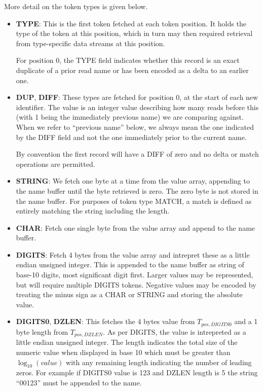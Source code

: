 \documentclass[a4paper]{article}
\begin{document}
More detail on the token types is given below.

\begin{itemize}
\item{\textbf{TYPE}:}
This is the first token fetched at each token position.  It holds the
type of the token at this position, which in turn may then required
retrieval from type-specific data streams at this position.

For position 0, the TYPE field indicates whether this record is an
exact duplicate of a prior read name or has been encoded as a delta to
an earlier one.

\item{\textbf{DUP}, \textbf{DIFF}:}
These types are fetched for position 0, at the start of each new
identifier.  The value is an integer value describing how many reads
before this (with 1 being the immediately previous name) we are
comparing against.  When we refer to ``previous name'' below, we
always mean the one indicated by the DIFF field and not the one
immediately prior to the current name.

By convention the first record will have a DIFF of zero and no delta
or match operations are permitted.

\item{\textbf{STRING}:}
We fetch one byte at a time from the value array, appending to the
name buffer until the byte retrieved is zero.  The zero byte is not
stored in the name buffer.
For purposes of token type MATCH, a match is defined as entirely
matching the string including the length.

\item{\textbf{CHAR}:}
Fetch one single byte from the value array and append to the name buffer.

\item{\textbf{DIGITS}:}
Fetch 4 bytes from the value array and intrepret these as a little
endian unsigned integer.  This is appended to the name buffer as
string of base-10 digits, most significant digit first.  Larger
values may be represented, but will require multiple DIGITS tokens.
Negative values may be encoded by treating the minus sign as a CHAR or
STRING and storing the absolute value.

\item{\textbf{DIGITS0}, \textbf{DZLEN}:}
This fetches the 4 bytes value from $T_{pos,DIGITS0}$ and a 1 byte
length from $T_{pos,DZLEN}$.  As per DIGITS, the value is intrepreted as a
little endian unsigned integer.  The length indicates the total
size of the numeric value when displayed in base 10 which must be
greater than $\log_{10}(value)$ with any remaining length indicating
the number of leading zeros.  For example if DIGITS0 value is 123 and
DZLEN length is 5 the string ``00123'' must be appended to the name.


\end{itemize}
\end{document}

